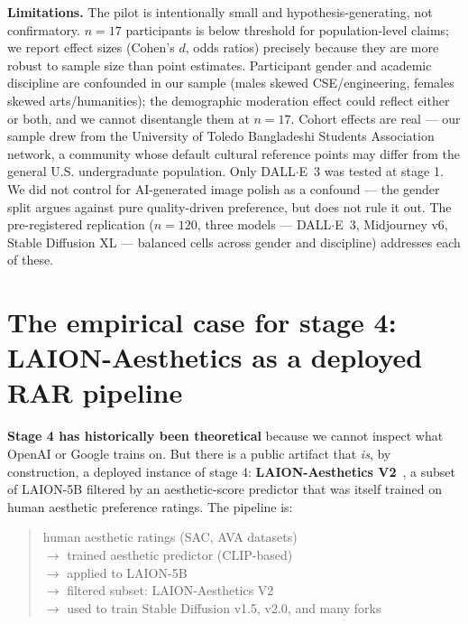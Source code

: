 \documentclass[sigconf,nonacm]{acmart}
\begin{document}
\textbf{Limitations.} The pilot is intentionally small and hypothesis-generating, not confirmatory. \(n=17\) participants is below threshold for population-level claims; we report effect sizes (Cohen's \(d\), odds ratios) precisely because they are more robust to sample size than point estimates. Participant gender and academic discipline are confounded in our sample (males skewed CSE/engineering, females skewed arts/humanities); the demographic moderation effect could reflect either or both, and we cannot disentangle them at \(n=17\). Cohort effects are real --- our sample drew from the University of Toledo Bangladeshi Students Association network, a community whose default cultural reference points may differ from the general U.S. undergraduate population. Only DALL$\cdot$E~3 was tested at stage 1. We did not control for AI-generated image polish as a confound --- the gender split argues against pure quality-driven preference, but does not rule it out. The pre-registered replication (\(n=120\), three models --- DALL$\cdot$E~3, Midjourney v6, Stable Diffusion XL --- balanced cells across gender and discipline) addresses each of these.

\section{The empirical case for stage 4: LAION-Aesthetics as a deployed RAR pipeline}
\label{sec:stage4}

\textbf{Stage 4 has historically been theoretical} because we cannot inspect what OpenAI or Google trains on. But there is a public artifact that \emph{is}, by construction, a deployed instance of stage 4: \textbf{LAION-Aesthetics V2}~\cite{schuhmann2022laion}, a subset of LAION-5B filtered by an aesthetic-score predictor that was itself trained on human aesthetic preference ratings. The pipeline is:

\begin{quote}\small
human aesthetic ratings (SAC, AVA datasets)\\
\(\rightarrow\) trained aesthetic predictor (CLIP-based)\\
\(\rightarrow\) applied to LAION-5B\\
\(\rightarrow\) filtered subset: LAION-Aesthetics V2\\
\(\rightarrow\) used to train Stable Diffusion v1.5, v2.0, and many forks
\end{quote}
\end{document}
